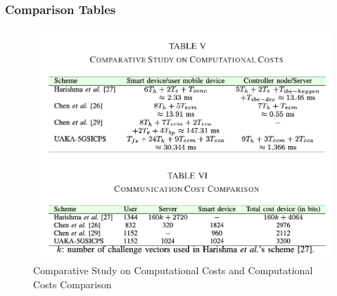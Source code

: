 \documentclass[9pt,handout]{beamer}
\begin{document}
\begin{frame}
    \frametitle{Comparison Tables}
    \begin{figure}
        \centering
        \includegraphics[width=0.9\linewidth]{comptable.png} %
        \caption{Comparative Study on Computational Costs and Computational Costs Comparison}
    \end{figure}
\end{frame}
\end{document}
